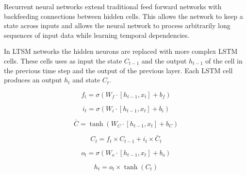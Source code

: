 Recurrent neural networks extend traditional feed forward networks with backfeeding connections between hidden cells.
This allows the network to keep a state across inputs and allows the neural network to process arbitrarily long sequences of input data while learning temporal dependencies.

In LTSM networks the hidden neurons are replaced with more complex LSTM cells.
These cells uses as input the state $C_{t-1}$ and the output $h_{t-1}$ of the cell in the previous time step and the output of the previous layer.
Each LSTM cell produces an output $h_t$ and state $C_t$.


\begin{equation}\label{key}
	f_t = \sigma(W_f \cdot [h_{t-1}, x_t] + b_f)
\end{equation}

\begin{equation}\label{key}
	i_t = \sigma (W_i \cdot [h_{t-1}, x_t] + b_i)
\end{equation}

\begin{equation}\label{key}
	\bar{C} = \tanh (W_C \cdot [h_{t-1}, x_t] + b_C)
\end{equation}

\begin{equation}\label{key}
	C_t = f_t \times C_{t-1} + i_t \times \bar{C}_t
\end{equation}

\begin{equation}\label{key}
	o_t = \sigma (W_o \cdot [h_{t-1}, x_t] + b_o)
\end{equation}

\begin{equation}\label{key}
	h_t = o_t \times \tanh(C_t )
\end{equation}



